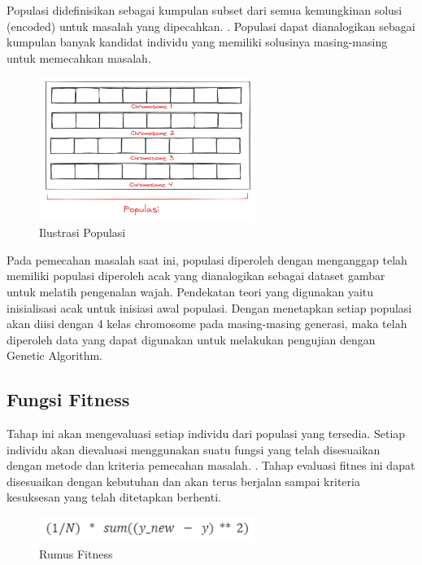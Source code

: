 \documentclass[conference]{IEEEtran}
\begin{document}
Populasi didefinisikan sebagai kumpulan subset dari semua kemungkinan solusi (encoded) untuk masalah yang dipecahkan. \cite{Champlin2018}. Populasi dapat dianalogikan sebagai kumpulan banyak kandidat individu yang memiliki solusinya masing-masing untuk memecahkan masalah. \cite{Hijriana2015}

\begin{figure}[htp]
    \centering
    \includegraphics[width=7cm]{images/inisialisasi populasi_2.png}
    \caption{Ilustrasi Populasi}
    \label{fig:populasi}
\end{figure}

Pada pemecahan masalah saat ini, populasi diperoleh dengan menganggap telah memiliki populasi diperoleh acak yang dianalogikan sebagai dataset gambar untuk melatih pengenalan wajah. Pendekatan teori yang digunakan yaitu inisialisasi acak untuk inisiasi awal populasi. Dengan menetapkan setiap populasi akan diisi dengan 4 kelas chromosome pada masing-masing generasi, maka telah diperoleh data yang dapat digunakan untuk melakukan pengujian dengan Genetic Algorithm.

\subsection{Fungsi Fitness}

Tahap ini akan mengevaluasi setiap individu dari populasi yang tersedia. Setiap individu akan dievaluasi menggunakan suatu fungsi yang telah disesuaikan dengan metode dan kriteria pemecahan masalah. \cite{Marleny2019}. Tahap evaluasi fitnes ini dapat disesuaikan dengan kebutuhan dan akan terus berjalan sampai kriteria kesuksesan yang telah ditetapkan berhenti.

\begin{figure}[htp]
    \centering
    \includegraphics[width=7cm]{images/formula_fitness.png}
    \caption{Rumus Fitness}
    \label{fig:fitness}
\end{figure}
\end{document}
